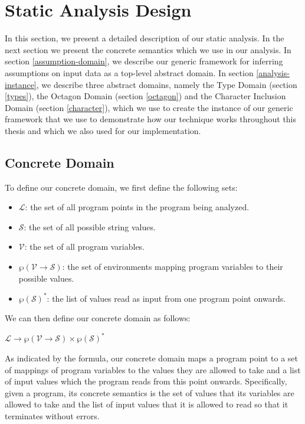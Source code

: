 \documentclass[10pt]{report}
\begin{document}
\chapter{Static Analysis Design} \label{analysis}
In this section, we present a detailed description of our static analysis. In the next section we present the concrete semantics which we use in our analysis. In section \ref{assumption-domain}, we describe our generic framework for inferring assumptions on input data as a top-level abstract domain. In section \ref{analysis-instance}, we describe three abstract domains, namely the Type Domain (section \ref{types}), the Octagon Domain (section \ref{octagon}) and the Character Inclusion Domain (section \ref{character}), which we use to create the instance of our generic framework that we use to demonstrate how our technique works throughout this thesis and which we also used for our implementation. 
\section{Concrete Domain} \label{concrete}

To define our concrete domain, we first define the following sets:
\begin{itemize}
	\item $\mathcal{L}$: the set of all program points in the program being analyzed. 
	\item $\mathcal{S}$: the set of all possible string values. 
	\item $\mathcal{V}$: the set of all program variables.
	\item$\wp(\mathcal{V} \rightarrow \mathcal{S})$: the set of environments mapping program variables to their possible values. 
	\item $\wp(\mathcal{S})^{*}$: the list of values read as input from one program point onwards.  
\end{itemize}

We can then define our concrete domain as follows: 
\begin{center}
$\mathcal{L} \rightarrow \wp(\mathcal{V} \rightarrow \mathcal{S}) \times \wp(\mathcal{S})^{*}$
\end{center}

As indicated by the formula, our  concrete domain maps a program point to a set of mappings of program variables to the values they are allowed to take and a list of input values which the program reads from this point onwards. Specifically, given a program, its concrete semantics is the set of values that its variables are allowed to take and the list of input values that it is allowed to read so that it terminates without errors.   
\end{document}
